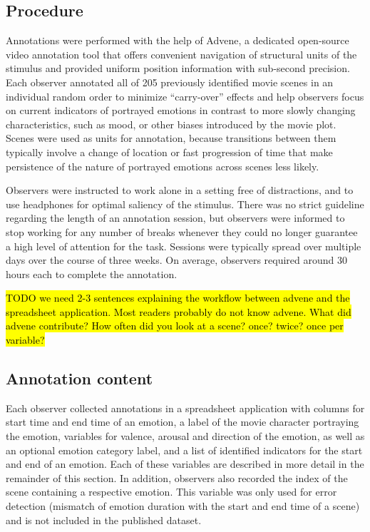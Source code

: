\subsection*{Procedure}

Annotations were performed with the help of Advene\cite{AP2005}, a dedicated
open-source video annotation tool that offers convenient navigation of
structural units of the stimulus and provided uniform position information with
sub-second precision.  Each observer annotated all of 205 previously identified
movie scenes in an individual random order to minimize ``carry-over'' effects
and help observers focus on current indicators of portrayed emotions in
contrast to more slowly changing characteristics, such as mood, or other biases
introduced by the movie plot. Scenes were used as units for annotation, because
transitions between them typically involve a change of location or fast
progression of time that make persistence of the nature of portrayed emotions
across scenes less likely.

Observers were instructed to work alone in a setting free of distractions, and
to use headphones for optimal saliency of the stimulus. There was no strict
guideline regarding the length of an annotation session, but observers were
informed to stop working for any number of breaks whenever they could no longer
guarantee a high level of attention for the task. Sessions were typically
spread over multiple days over the course of three weeks. On average, observers
required around 30 hours each to complete the annotation.

\hl{TODO we need 2-3 sentences explaining the workflow between advene and the
spreadsheet application. Most readers probably do not know advene. What did
advene contribute? How often did you look at a scene? once? twice? once per
variable?}

\subsection*{Annotation content}

Each observer collected annotations in a spreadsheet application with columns
for start time and end time of an emotion, a label of the movie character
portraying the emotion, variables for valence, arousal and direction of the
emotion, as well as an optional emotion category label, and a list of
identified indicators for the start and end of an emotion. Each of these
variables are described in more detail in the remainder of this section. In
addition, observers also recorded the index of the scene containing a
respective emotion. This variable was only used for error detection (mismatch
of emotion duration with the start and end time of a scene) and is not included
in the published dataset.

